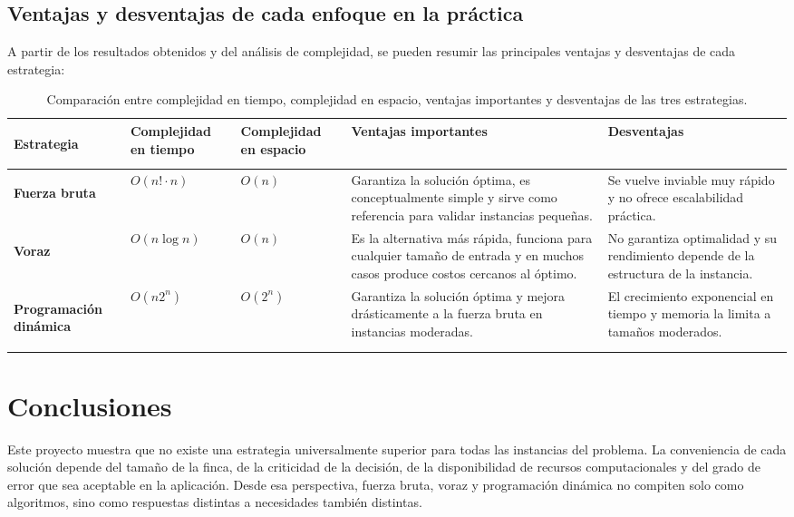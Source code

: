 \documentclass[12pt,a4paper]{article}
\begin{document}
\subsection{Ventajas y desventajas de cada enfoque en la pr\'actica}

A partir de los resultados obtenidos y del an\'alisis de complejidad, se pueden resumir las principales ventajas y desventajas de cada estrategia:

\begin{table}[H]
  \centering
  \footnotesize
  \setlength{\tabcolsep}{3pt}
  \renewcommand{\arraystretch}{1.2}
  \begin{tabularx}{\textwidth}{>{\bfseries\raggedright\arraybackslash}p{}>{\centering\arraybackslash}p{}>{\centering\arraybackslash}p{}>{\raggedright\arraybackslash}X>{\raggedright\arraybackslash}X}
    \toprule
    Estrategia & Complejidad en tiempo & Complejidad en espacio & Ventajas importantes & Desventajas \\
    \midrule
    \textbf{Fuerza bruta} &
    \(O(n! \cdot n)\) &
    \(O(n)\) &
    Garantiza la soluci\'on \'optima, es conceptualmente simple y sirve como referencia para validar instancias peque\~nas. &
    Se vuelve inviable muy r\'apido y no ofrece escalabilidad pr\'actica. \\
    \midrule
    \textbf{Voraz} &
    \(O(n \log n)\) &
    \(O(n)\) &
    Es la alternativa m\'as r\'apida, funciona para cualquier tama\~no de entrada y en muchos casos produce costos cercanos al \'optimo. &
    No garantiza optimalidad y su rendimiento depende de la estructura de la instancia. \\
    \midrule
    \textbf{Programaci\'on din\'amica} &
    \(O(n2^n)\) &
    \(O(2^n)\) &
    Garantiza la soluci\'on \'optima y mejora dr\'asticamente a la fuerza bruta en instancias moderadas. &
    El crecimiento exponencial en tiempo y memoria la limita a tama\~nos moderados. \\
    \bottomrule
  \end{tabularx}
  \caption{Comparaci\'on entre complejidad en tiempo, complejidad en espacio, ventajas importantes y desventajas de las tres estrategias.}
\end{table}

\section{Conclusiones}

Este proyecto muestra que no existe una estrategia universalmente superior para todas las instancias del problema. La conveniencia de cada soluci\'on depende del tama\~no de la finca, de la criticidad de la decisi\'on, de la disponibilidad de recursos computacionales y del grado de error que sea aceptable en la aplicaci\'on. Desde esa perspectiva, fuerza bruta, voraz y programaci\'on din\'amica no compiten solo como algoritmos, sino como respuestas distintas a necesidades tambi\'en distintas.
\end{document}
